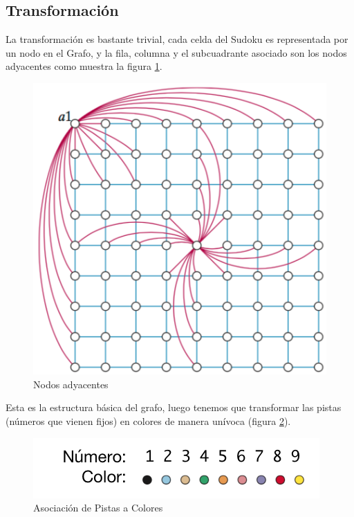 \documentclass[a4paper,spanish]{article}
\begin{document}
\subsection{Transformación}
\label{sec:transformacion}

La transformación es bastante trivial, cada celda del Sudoku es representada por
un nodo en el Grafo, y la fila, columna y el subcuadrante asociado son los nodos
adyacentes como muestra la figura \ref{img:adyacentes}.


\begin{figure}[h]
	\centering
	\includegraphics[scale=0.5]{./img/adyacentes.png}
    \caption{Nodos adyacentes}
    \label{img:adyacentes}
\end{figure}

Esta es la estructura básica del grafo, luego tenemos que transformar las pistas
(números que vienen fijos) en colores de manera unívoca (figura \ref{img:color_map}).

\begin{figure}[b]
	\centering
	\includegraphics[scale=0.5]{./img/numero_color.png}
    \caption{Asociación de Pistas a Colores}
    \label{img:color_map}
\end{figure}
\end{document}
